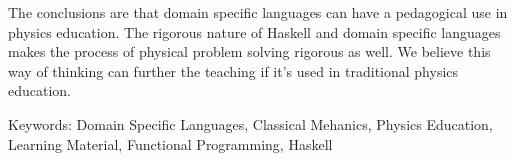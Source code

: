 The conclusions are that domain specific languages can have a pedagogical use in physics education. The rigorous nature of Haskell and domain specific languages makes the process of physical problem solving rigorous as well. We believe this way of thinking can further the teaching if it's used in traditional physics education.













\vfill
Keywords: Domain Specific Languages, Classical Mehanics, Physics Education, Learning Material, Functional Programming, Haskell


\newpage				%
\thispagestyle{empty}
\mbox{}

